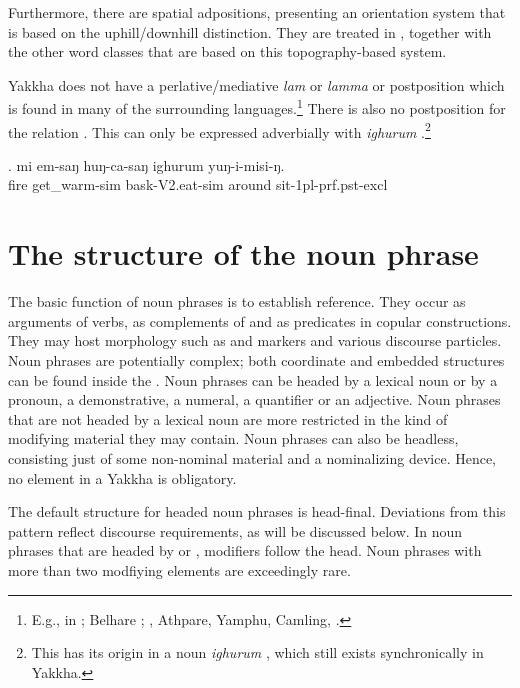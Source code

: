 Furthermore, there are spatial adpositions,  presenting an orientation system that is based on the uphill/downhill distinction. They are treated in , together with the other word classes that are based on this topography-based system.

 	
Yakkha does not have a perlative/mediative \emph{lam} or \emph{lamma}  or postposition which is found in many of the surrounding languages.\footnote{E.g., in  \citep{Schikowski2012_Morphology}; Belhare \citep{Bickel2003Belhare};  \citep{Driem1987A-grammar}, Athpare, Yamphu, Camling,  \citep{Ebert2003Kiranti}.} There is also no postposition for the relation . This can only be expressed adverbially with \emph{ighurum} \Next.\footnote{This  has its origin in a noun \emph{ighurum} , which still exists synchronically in Yakkha.}

	\exg.  mi   em-saŋ           huŋ-ca-saŋ            ighurum yuŋ-i-misi-ŋ.\\
	fire get\_warm{\sc -sim} bask{\sc -V2.eat-sim} around sit{\sc -1pl-prf.pst-excl}\\
	 
	

\section{The structure of the noun phrase}\label{str-np}

The basic function of noun phrases is to establish reference. They occur as arguments of verbs, as complements of  and as predicates in copular constructions. They may host morphology such as  and  markers  and various discourse particles. Noun phrases are potentially complex; both coordinate and embedded structures can be found inside the . Noun phrases can be headed by a lexical noun or by a pronoun, a demonstrative, a numeral, a quantifier or an adjective. Noun phrases that are not headed by a lexical noun are more restricted in the kind of modifying material they may contain. Noun phrases can also be headless, consisting just of some non-nominal material and a nominalizing device. Hence, no element in a Yakkha  is obligatory. 

 The default structure for headed  noun phrases is head-final. Deviations from this pattern reflect discourse requirements, as will be discussed below.  In noun phrases that are headed by   or , modifiers follow the head. Noun phrases with more than two modfiying elements are exceedingly rare.
 
